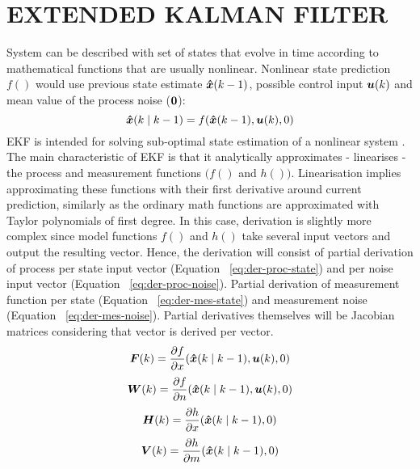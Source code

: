 \section{EXTENDED KALMAN FILTER} \label{sec:ekf}
System can be described with set of states that evolve in time according to mathematical functions that are usually nonlinear. Nonlinear state prediction $f()$ would use previous state estimate $ \boldsymbol{\hat{x}}(k-1) $, possible control input $\boldsymbol{u}(k)$ and mean value of the process noise ($\boldsymbol{0}$):
\begin{equation}
\boldsymbol{\hat{x}}(k \mid k-1) = f(\boldsymbol{\hat{x}}(k-1), \boldsymbol{u}(k), 0)
\label{eq:state-pred-nonlin}
\end{equation} 
EKF is intended for solving sub-optimal state estimation of a nonlinear system \cite{grewal01}. The main characteristic of EKF is that it analytically approximates - linearises - the process and measurement functions $(f()$ and $h())$. Linearisation implies approximating these functions with their first derivative around current prediction, similarly as the ordinary math functions are approximated with Taylor polynomials of first degree. In this case, derivation is slightly more complex since model functions $f()$ and $h()$ take several input vectors and output the resulting vector. Hence, the derivation will consist of partial derivation of process per state input vector (Equation ~\ref{eq:der-proc-state}) and per noise input vector (Equation ~\ref{eq:der-proc-noise}). Partial derivation of measurement function per state (Equation ~\ref{eq:der-mes-state}) and measurement noise (Equation ~\ref{eq:der-mes-noise}). Partial derivatives themselves will be Jacobian matrices considering that vector is derived per vector. 
\begin{equation}
\boldsymbol{F}(k) = \frac{\partial f}{\partial x} (\boldsymbol{\hat{x}}(k \mid k-1), \boldsymbol{u}(k), 0)
\label{eq:der-proc-state}
\end{equation} 
\begin{equation}
\boldsymbol{W}(k) = \frac{\partial f}{\partial n} (\boldsymbol{\hat{x}}(k \mid k-1), \boldsymbol{u}(k), 0)
\label{eq:der-proc-noise}
\end{equation}
\begin{equation}
\boldsymbol{H}(k) = \frac{\partial h}{\partial x} (\boldsymbol{\hat{x}}(k \mid k-1), 0)
\label{eq:der-mes-state}
\end{equation} 
\begin{equation}
\boldsymbol{V}(k) = \frac{\partial h}{\partial m} (\boldsymbol{\hat{x}}(k \mid k-1), 0)
\label{eq:der-mes-noise}
\end{equation}
